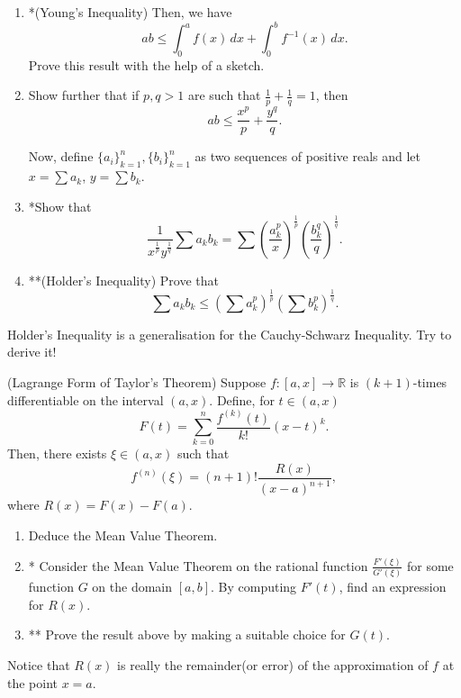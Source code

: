 \documentclass[../main.tex]{subfiles}
\begin{document}
\begin{enumerate}
    \item *(Young's Inequality) Then, we have $$ab \leq \int_{0}^{a}f(x)\, dx+\int_{0}^{b}f^{-1}(x)\, dx.$$
    Prove this result with the help of a sketch.
    \item Show further that if $p, q > 1$ are such that $\frac{1}{p}+\frac{1}{q}=1$, then
    $$ab \leq \frac{x^p}{p}+\frac{y^q}{q}.$$
    
    Now, define $\{a_i\}_{k=1}^n,\{b_i\}_{k=1}^n$ as two sequences of positive reals and let $x=\sum a_k$, $y=\sum b_k$.
    \item *Show that $$\frac{1}{x^{\frac{1}{p}}y^{\frac{1}{q}}}\sum a_kb_k=\sum\left(\frac{a_k^p}{x}\right)^\frac{1}{p}\left(\frac{b_k^q}{q}\right)^\frac{1}{q}.$$
    \item **(Holder's Inequality) Prove that $$\sum a_kb_k\leq \left(\sum a_k^p\right)^\frac{1}{p}\left(\sum b_k^p\right)^\frac{1}{q}.$$
\end{enumerate} 
\begin{remark}
Holder's Inequality is a generalisation for the Cauchy-Schwarz Inequality. Try to derive it!
\end{remark}

\problem (Lagrange Form of Taylor's Theorem) Suppose $f:[a,x]\to\mathbb{R}$ is $(k+1)$-times differentiable on the interval $(a,x)$. Define, for $t\in (a,x)$
$$F(t)=\sum_{k=0}^{n}\frac{f^{(k)}(t)}{k!}(x-t)^k.$$
Then, there exists $\xi \in (a,x)$ such that
$$f^{(n)}(\xi)=(n+1)!\frac{R(x)}{(x-a)^{n+1}},$$
where $R(x)=F(x)-F(a)$.
\begin{enumerate}
    \item Deduce the Mean Value Theorem.
    \item * Consider the Mean Value Theorem on the rational function $\frac{F'(\xi)}{G'(\xi)}$ for some function $G$ on the domain $[a,b]$. By computing $F'(t)$, find an expression for $R(x)$.
    \item ** Prove the result above by making a suitable choice for $G(t)$.
\end{enumerate}
\begin{remark}
Notice that $R(x)$ is really the remainder(or error) of the approximation of $f$ at the point $x=a$.
\end{remark}
\end{document}
